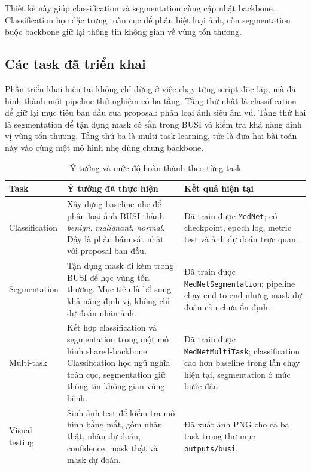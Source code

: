 \documentclass[12pt,a4paper]{article}
\begin{document}
Thiết kế này giúp classification và segmentation cùng cập nhật backbone. Classification học đặc trưng toàn cục để phân biệt loại ảnh, còn segmentation buộc backbone giữ lại thông tin không gian về vùng tổn thương.

\subsection{Các task đã triển khai}

Phần triển khai hiện tại không chỉ dừng ở việc chạy từng script độc lập, mà đã hình thành một pipeline thử nghiệm có ba tầng. Tầng thứ nhất là classification để giữ lại mục tiêu ban đầu của proposal: phân loại ảnh siêu âm vú. Tầng thứ hai là segmentation để tận dụng mask có sẵn trong BUSI và kiểm tra khả năng định vị vùng tổn thương. Tầng thứ ba là multi-task learning, tức là đưa hai bài toán này vào cùng một mô hình nhẹ dùng chung backbone.

\begin{table}[H]
\centering
\caption{Ý tưởng và mức độ hoàn thành theo từng task}
\renewcommand{\arraystretch}{1.25}
\begin{tabular}{p{3.2cm} p{5.3cm} p{6.2cm}}
\toprule
\textbf{Task} & \textbf{Ý tưởng đã thực hiện} & \textbf{Kết quả hiện tại} \\
\midrule
Classification & Xây dựng baseline nhẹ để phân loại ảnh BUSI thành \textit{benign}, \textit{malignant}, \textit{normal}. Đây là phần bám sát nhất với proposal ban đầu. & Đã train được \texttt{MedNet}; có checkpoint, epoch log, metric test và ảnh dự đoán trực quan. \\
Segmentation & Tận dụng mask đi kèm trong BUSI để học vùng tổn thương. Mục tiêu là bổ sung khả năng định vị, không chỉ dự đoán nhãn ảnh. & Đã train được \texttt{MedNetSegmentation}; pipeline chạy end-to-end nhưng mask dự đoán còn chưa ổn định. \\
Multi-task & Kết hợp classification và segmentation trong một mô hình shared-backbone. Classification học ngữ nghĩa toàn cục, segmentation giữ thông tin không gian vùng bệnh. & Đã train được \texttt{MedNetMultiTask}; classification cao hơn baseline trong lần chạy hiện tại, segmentation ở mức bước đầu. \\
Visual testing & Sinh ảnh test để kiểm tra mô hình bằng mắt, gồm nhãn thật, nhãn dự đoán, confidence, mask thật và mask dự đoán. & Đã xuất ảnh PNG cho cả ba task trong thư mục \texttt{outputs/busi}. \\
\bottomrule
\end{tabular}
\end{table}
\end{document}
